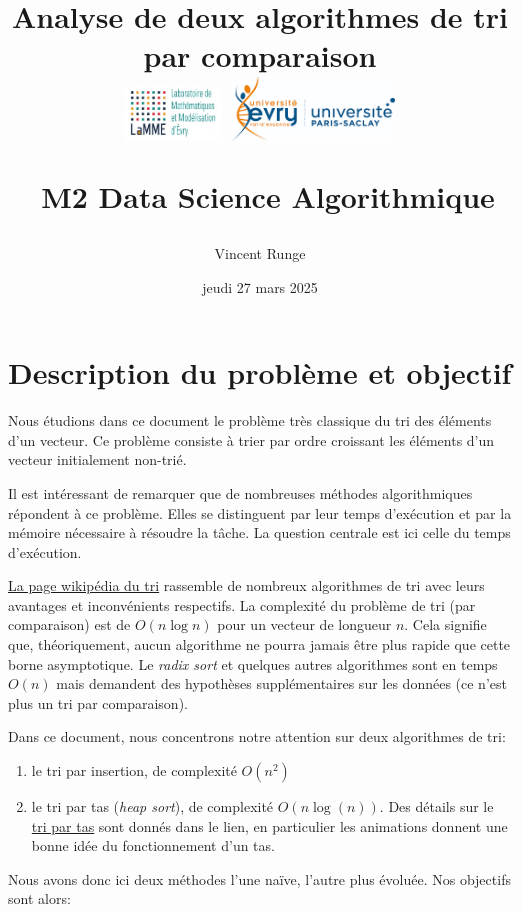 \documentclass[
]{article}
\title{Analyse de deux algorithmes de tri par comparaison\\
\includegraphics[width=1in,height=\textheight]{Images/logo_lamme.png}
\includegraphics[width=1.7in,height=\textheight]{Images/logo_UEVE.png}\\
\strut ~M2 Data Science Algorithmique}
\author{Vincent Runge}
\date{jeudi 27 mars 2025}
\begin{document}
\maketitle

{
\hypersetup{linkcolor=}
\setcounter{tocdepth}{2}
\tableofcontents
}
\noindent\hrulefill

\section{Description du problème et
objectif}\label{description-du-probluxe8me-et-objectif}

Nous étudions dans ce document le problème très classique du tri des
éléments d'un vecteur. Ce problème consiste à trier par ordre croissant
les éléments d'un vecteur initialement non-trié.

Il est intéressant de remarquer que de nombreuses méthodes
algorithmiques répondent à ce problème. Elles se distinguent par leur
temps d'exécution et par la mémoire nécessaire à résoudre la tâche. La
question centrale est ici celle du temps d'exécution.

\href{https://fr.wikipedia.org/wiki/Algorithme_de_tri}{La page wikipédia
du tri} rassemble de nombreux algorithmes de tri avec leurs avantages et
inconvénients respectifs. La complexité du problème de tri (par
comparaison) est de \(O(n \log n)\) pour un vecteur de longueur \(n\).
Cela signifie que, théoriquement, aucun algorithme ne pourra jamais être
plus rapide que cette borne asymptotique. Le \emph{radix sort} et
quelques autres algorithmes sont en temps \(O(n)\) mais demandent des
hypothèses supplémentaires sur les données (ce n'est plus un tri par
comparaison).

Dans ce document, nous concentrons notre attention sur deux algorithmes
de tri:

\begin{enumerate}
\def\labelenumi{\arabic{enumi})}
\item
  le tri par insertion, de complexité \textbf{\(O(n^2)\)}
\item
  le tri par tas (\emph{heap sort}), de complexité
  \textbf{\(O(n \log(n))\)}. Des détails sur le
  \href{https://en.wikipedia.org/wiki/Heapsort}{tri par tas} sont donnés
  dans le lien, en particulier les animations donnent une bonne idée du
  fonctionnement d'un tas.
\end{enumerate}

Nous avons donc ici deux méthodes l'une naïve, l'autre plus évoluée. Nos
objectifs sont alors:
\end{document}

